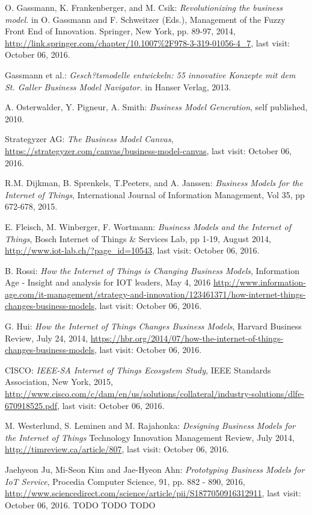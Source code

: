 	 \begin{thebibliography}{99}
 		  O. Gassmann, K. Frankenberger, and M. Csik: \emph{Revolutionizing the business model.} in O. Gassmann and F. Schweitzer (Eds.), Management of the Fuzzy Front End of Innovation. Springer, New York, pp. 89-97, 2014, \url{http://link.springer.com/chapter/10.1007%2F978-3-319-01056-4_7}, last visit: October 06, 2016.

 		  Gassmann et al.: \emph{Gesch?tsmodelle entwickeln: 55 innovative Konzepte mit dem St. Galler Business Model Navigator.} in Hanser Verlag, 2013.

 		  A. Osterwalder, Y. Pigneur, A. Smith: \emph{Business Model Generation}, self published, 2010.

 		  Strategyzer AG: \emph{The Business Model Canvas}, \url{https://strategyzer.com/canvas/business-model-canvas}, last visit: October 06, 2016.

 		  R.M. Dijkman, B. Sprenkels, T.Peeters, and A. Janssen: \emph{Business Models for the Internet of Things}, International Journal of Information Management, Vol 35, pp 672-678, 2015.

 		  E. Fleisch, M. Winberger, F. Wortmann: \emph{Business Models and the Internet of Things}, Bosch Internet of Things \& Services Lab, pp 1-19, August 2014, \url{http://www.iot-lab.ch/?page_id=10543}, last visit: October 06, 2016.

 		  B. Rossi: \emph{How the Internet of Things is Changing Business Models}, Information Age - Insight and analysis for IOT leaders, May 4, 2016 \url{http://www.information-age.com/it-management/strategy-and-innovation/123461371/how-internet-things-changes-business-models}, last visit: October 06, 2016.

 		  G. Hui: \emph{How the Internet of Things Changes Business Models}, Harvard Business Review, July 24, 2014, \url{https://hbr.org/2014/07/how-the-internet-of-things-changes-business-models}, last visit: October 06, 2016.

 		  CISCO: \emph{IEEE-SA Internet of Things Ecosystem Study}, IEEE Standards Association, New York, 2015, \url{http://www.cisco.com/c/dam/en/us/solutions/collateral/industry-solutions/dlfe-670918525.pdf}, last visit: October 06, 2016.

 		 M. Westerlund, S. Leminen and M. Rajahonka: \emph{Designing Business Models for the Internet of Things} Technology Innovation Management Review, July 2014, \url{http://timreview.ca/article/807}, last visit: October 06, 2016.

 		 Jaehyeon Ju, Mi-Seon Kim and Jae-Hyeon Ahn: \emph{Prototyping Business Models for IoT Service}, Procedia Computer Science, 91, pp. 882 - 890, 2016, \url{http://www.sciencedirect.com/science/article/pii/S1877050916312911}, last visit: October 06, 2016.
 		 TODO
 		 TODO
 		 TODO
	 \end{thebibliography}

